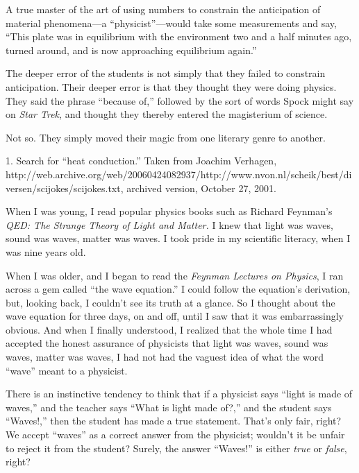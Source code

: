 {
 A true master of the art of using numbers to constrain the
anticipation of material phenomena---a
``physicist''---would take some
measurements and say, ``This plate was in equilibrium
with the environment two and a half minutes ago, turned around, and is
now approaching equilibrium again.''}

{
 The deeper error of the students is not simply that they failed to
constrain anticipation. Their deeper error is that they thought they
were doing physics. They said the phrase ``because
of,'' followed by the sort of words Spock might say
on \textit{Star Trek}, and thought they thereby entered the magisterium
of science.}

{
 Not so. They simply moved their magic from one literary genre to
another.}

\myendsectiontext


\bigskip

 1. Search for ``heat
conduction.'' Taken from Joachim Verhagen,
http://web.archive.org/web/20060424082937/\-http://www.nvon.nl/scheik/best/diversen/scijokes/scijokes.txt,
archived version, October 27, 2001.


{
 When I was young, I read popular physics books such as Richard
Feynman's \textit{QED: The Strange Theory of Light and
Matter.} I knew that light was waves, sound was waves, matter was
waves. I took pride in my scientific literacy, when I was nine years
old. }

{
 When I was older, and I began to read the \textit{Feynman Lectures
on Physics}, I ran across a gem called ``the wave
equation.'' I could follow the
equation's derivation, but, looking back, I
couldn't see its truth at a glance. So I thought about
the wave equation for three days, on and off, until I saw that it was
embarrassingly obvious. And when I finally understood, I realized that
the whole time I had accepted the honest assurance of physicists that
light was waves, sound was waves, matter was waves, I had not had the
vaguest idea of what the word
``wave'' meant to a physicist.}

{
 There is an instinctive tendency to think that if a physicist says
``light is made of waves,'' and the
teacher says ``What is light made
of?,'' and the student says
``Waves!,'' then the student has
made a true statement. That's only fair, right? We
accept ``waves'' as a correct answer
from the physicist; wouldn't it be unfair to reject it
from the student? Surely, the answer
``Waves!'' is either \textit{true}
or \textit{false}, right?}

